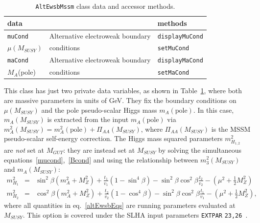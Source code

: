 \documentclass{article}
\def\code#1{\small{\tt #1}\normalsize}
\begin{document}
\begin{table}\begin{center}\begin{tabular}{lll}      
data & & methods \\ \hline
\code{muCond} & Alternative electroweak boundary & \code{displayMuCond} \\
 $\mu(M_{SUSY})$ & conditions & \code{setMuCond} \\
\code{maCond} & Alternative electroweak boundary & \code{displayMaCond} \\
 $M_A$(pole) & conditions & \code{setMaCond} \\
\end{tabular}\caption{\label{tab:altewsb}\code{AltEwsbMssm} class data and
  accessor methods.}\end{center}\end{table} 
This class has just two private data variables, as shown in
Table~\ref{tab:altewsb}, 
where both are massive parameters in units of GeV. 
They fix the
boundary conditions on $\mu(M_{SUSY})$ and the pole pseudo-scalar Higgs
mass $m_A(\mbox{pole})$. In this case, $m_A(M_{SUSY})$ is extracted 
from the input $m_A(\mbox{pole})$ via $m_A^2(M_{SUSY}) = m_A^2(\mbox{pole})
 + \Pi_{AA}(M_{SUSY})$, where $\Pi_{AA}(M_{SUSY})$ is the MSSM pseudo-scalar 
self-energy correction.
The Higgs mass squared parameters
$m_{H_{1,2}}^2$ are {\em not}\/ set at $M_{GUT}$: they are instead set at
$M_{SUSY}$ by solving the simultaneous equations~\ref{mucond},~\ref{Bcond}
and using the relationship between $m_3^2(M_{SUSY})$ and $m_A(M_{SUSY})$:
\begin{eqnarray}
m_{H_1}^2 &=& \sin^2 \beta (m_A^2 + M_Z^2) + \frac{t_1}{v_1} (1 - \sin^4
\beta)
- \sin^2 \beta \cos^2 \beta \frac{t_2}{v_2} - (\mu^2 + \frac{1}{2} M_Z^2) 
\nonumber \\
m_{H_2}^2 &=& \cos^2 \beta (m_A^2 + M_Z^2) + \frac{t_2}{v_2} (1 - \cos^4
\beta)
- \sin^2 \beta \cos^2 \beta \frac{t_1}{v_1} - (\mu^2 + \frac{1}{2} M_Z^2),
\label{altEwsbEqs}
\end{eqnarray}
where all quantities in eq.~\ref{altEwsbEqs} are running parameters evaluated
at $M_{SUSY}$. 
This option is covered under the SLHA input parameters
\code{EXTPAR} 
\code{23,26}~\cite{lhacc}. 
\end{document}
